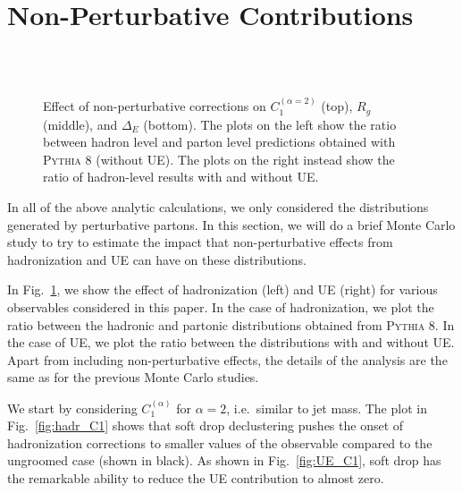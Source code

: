 \documentclass[letterpaper,11pt]{article}
\newcommand{\C}[2]{C^{(#2)}_{#1}}
\newcommand{\ea}{{\C{1}{\alpha}}}
\DeclareRobustCommand{\Fig}[1]{Fig.~\ref{#1}}
\newcommand{\pythia}[1]{\textsc{Pythia\xspace #1}}
\begin{document}
\section{Non-Perturbative Contributions}
\label{sec:NP}

\begin{figure}[p]
\begin{center}
$\quad$
~\\
$\quad$
~\\
$\quad$
\end{center}
\caption{Effect of non-perturbative corrections on $C_1^{(\alpha=2)}$ (top), $R_g$ (middle), and $\Delta_E$ (bottom).  The plots on the left show the ratio between hadron level and parton level predictions obtained with \pythia{8} (without UE). The plots on the right instead show the ratio of hadron-level results with and without UE.}
\label{fig:np_corrections}
\end{figure}

In all of the above analytic calculations, we only considered the distributions generated by perturbative partons.  In this section, we will do a brief Monte Carlo study to try to estimate the impact that non-perturbative effects from hadronization and UE can have on these distributions.

In \Fig{fig:np_corrections}, we show the effect of hadronization (left) and UE (right) for various observables considered in this paper.  In the case of hadronization, we plot the ratio between the hadronic and partonic distributions obtained from \pythia{8}. In the case of UE, we plot the ratio between the distributions with and without UE.  Apart from including non-perturbative effects, the details of the analysis are the same as for the previous Monte Carlo studies.

We start by considering $\ea$ for $\alpha=2$, i.e.\ similar to jet mass. The plot in \Fig{fig:hadr_C1} shows that soft drop declustering pushes the onset of hadronization corrections to smaller values of the observable compared to the ungroomed case (shown in black).  As shown in \Fig{fig:UE_C1}, soft drop has the remarkable ability to reduce the UE contribution to almost zero.
\end{document}
